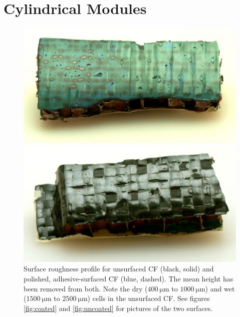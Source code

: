 \documentclass{aiaa-tc}%
\begin{document}
\section{Cylindrical Modules}\label{sec:modules}

\begin{figure}[t]
	\centering
	\parbox{0.45\linewidth}
	{
		\centering
		\includegraphics[width=\linewidth]{../img/coated.JPG}	
		\caption{A sandwich plate sample which has been coated with structural adhesive. The left side has been sanded and polished. See figure \ref{fig:roughness} for a plot of the surface profile.}
		\label{fig:coated}
	}
	\hfill
	\parbox{0.45\linewidth}
	{
		\centering
		\includegraphics[width=\linewidth]{../img/uncoated.JPG}	
		\caption{A sandwich plate sample which has \emph{not} been coated with structural adhesive. See figure \ref{fig:roughness} for a plot of the surface profile. Note the dry cells where the epoxy has not wetted the CF.}
		\label{fig:uncoated}
	}
	\parbox{4in}
	{
		\centering
		
			\caption{Surface roughness profile for unsurfaced CF (black, solid) and polished, adhesive-surfaced CF (blue, dashed). The mean height has been removed from both. Note the dry ($\SI{400}{\micro\meter}$ to $\SI{1000}{\micro\meter}$) and wet ($\SI{1500}{\micro\meter}$ to $\SI{2500}{\micro\meter}$) cells in the unsurfaced CF. See figures \ref{fig:coated}  and \ref{fig:uncoated} for pictures of the two surfaces.}
		\label{fig:roughness}
	}
\end{figure}
\end{document}
